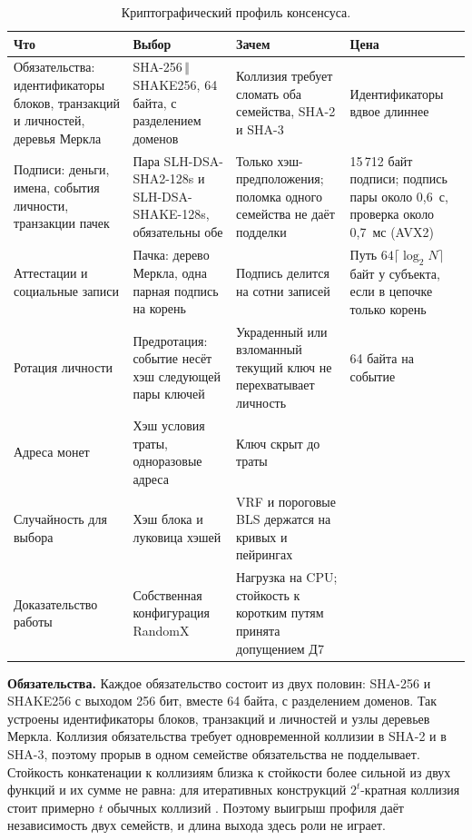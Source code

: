 \documentclass[10pt,a4paper]{article}
\newcommand{\cat}{\,\Vert\,}
\begin{document}
\begin{table}[t]
\centering\small
\caption{Криптографический профиль консенсуса.}
\label{tab:crypto}
\footnotesize
\begin{tabular}{L{3.5cm}L{4.2cm}L{4.1cm}L{3.4cm}}
\toprule
Что & Выбор & Зачем & Цена \\
\midrule
Обязательства: идентификаторы блоков, транзакций и личностей, деревья Меркла & SHA-256$\cat$SHAKE256, 64 байта, с разделением доменов & Коллизия требует сломать оба семейства, SHA-2 и SHA-3 & Идентификаторы вдвое длиннее \\
Подписи: деньги, имена, события личности, транзакции пачек & Пара SLH-DSA-SHA2-128s и SLH-DSA-SHAKE-128s, обязательны обе & Только хэш-предположения; поломка одного семейства не даёт подделки & 15\,712 байт подписи; подпись пары около 0,6~с, проверка около 0,7~мс (AVX2) \\
Аттестации и социальные записи & Пачка: дерево Меркла, одна парная подпись на корень & Подпись делится на сотни записей & Путь $64\lceil\log_2 N\rceil$ байт у субъекта, если в цепочке только корень \\
Ротация личности & Предротация: событие несёт хэш следующей пары ключей & Украденный или взломанный текущий ключ не перехватывает личность & 64 байта на событие \\
Адреса монет & Хэш условия траты, одноразовые адреса & Ключ скрыт до траты & \\
Случайность для выбора & Хэш блока и луковица хэшей & VRF и пороговые BLS держатся на кривых и пейрингах & \\
Доказательство работы & Собственная конфигурация RandomX & Нагрузка на CPU; стойкость к коротким путям принята допущением Д7 & \\
\bottomrule
\end{tabular}
\end{table}

\textbf{Обязательства.}
Каждое обязательство состоит из двух половин: SHA-256 и SHAKE256 с выходом 256 бит, вместе 64 байта, с разделением доменов.
Так устроены идентификаторы блоков, транзакций и личностей и узлы деревьев Меркла.
Коллизия обязательства требует одновременной коллизии в SHA-2 и в SHA-3, поэтому прорыв в одном семействе обязательства не подделывает.
Стойкость конкатенации к коллизиям близка к стойкости более сильной из двух функций и их сумме не равна: для итеративных конструкций $2^t$-кратная коллизия стоит примерно $t$ обычных коллизий \cite{joux}.
Поэтому выигрыш профиля даёт независимость двух семейств, и длина выхода здесь роли не играет.
\end{document}
